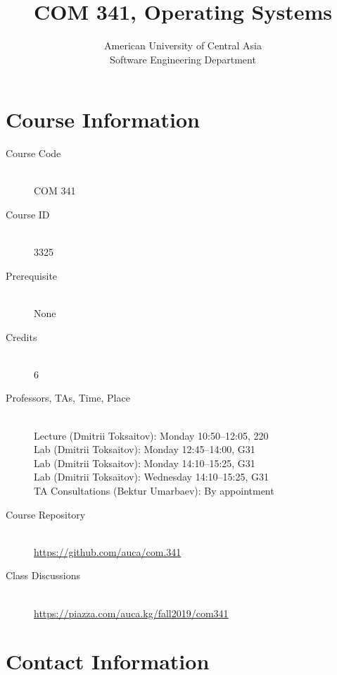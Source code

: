 \documentclass[12pt,a4paper,oneside]{article}
\begin{document}
    \title{COM 341, Operating Systems}
    \author{
        American University of Central Asia\\
        Software Engineering Department
    }
    \date{}
    \maketitle

    \section{Course Information}

        \begin{description}
            \item[Course Code]\hfill\\
                COM 341
            \item[Course ID]\hfill\\
                3325
            \item[Prerequisite]\hfill\\
                None
            \item[Credits]\hfill\\
                6
            \item[Professors, TAs, Time, Place]\hfill\\
                Lecture (Dmitrii Toksaitov): Monday 10:50--12:05, 220\\
                Lab (Dmitrii Toksaitov): Monday 12:45--14:00, G31\\
                Lab (Dmitrii Toksaitov): Monday 14:10--15:25, G31\\
                Lab (Dmitrii Toksaitov): Wednesday 14:10--15:25, G31\\
                TA Consultations (Bektur Umarbaev): By appointment
            \item[Course Repository]\hfill\\
                \url{https://github.com/auca/com.341}
            \item[Class Discussions]\hfill\\
                \url{https://piazza.com/auca.kg/fall2019/com341}
        \end{description}

    \section{Contact Information}
\end{document}
